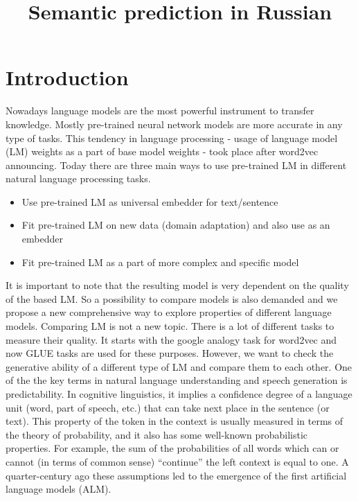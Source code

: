 \documentclass[a4paper]{article}
\title{Semantic prediction in {R}ussian}
\begin{document}
\hypersetup{allcolors = blue}
\maketitleabstract

\nocite{*}


\section{Introduction}

Nowadays language models are the most powerful instrument to transfer knowledge. Mostly pre-trained neural network models are more accurate in any type of tasks. This tendency in language processing - usage of language model (LM) weights as a part of base model weights - took place after word2vec announcing. Today there are three main ways to use pre-trained LM in different natural language processing tasks. 
\begin{itemize}
	\item Use pre-trained LM as universal embedder for text/sentence
	\item Fit pre-trained LM on new data (domain adaptation) and also use as an embedder
	\item Fit pre-trained LM as a part of more complex and specific model
\end{itemize}
It is important to note that the resulting model is very dependent on the quality of the based LM. So a possibility to compare models is also demanded and we propose a new comprehensive way to explore properties of different language models.
Comparing LM is not a new topic. There is a lot of different tasks to measure their quality. It starts with the google analogy task for word2vec \cite{mikolov2013efficient} and now GLUE tasks\cite{wang2018glue} are used for these purposes. However, we want to check the generative ability of a different type of LM and compare them to each other.
One of the the key terms in natural language understanding and speech generation is predictability. In cognitive linguistics, it implies a confidence degree of a language unit (word, part of speech, etc.) that can take next place in the sentence (or text). This property of the token in the context is usually measured in terms of the theory of probability, and it also has some well-known probabilistic properties. For example, the sum of the probabilities of all words which can or cannot (in terms of common sense) “continue” the left context is equal to one. A quarter-century ago these assumptions led to the emergence of the first artificial language models (ALM).
\end{document}
